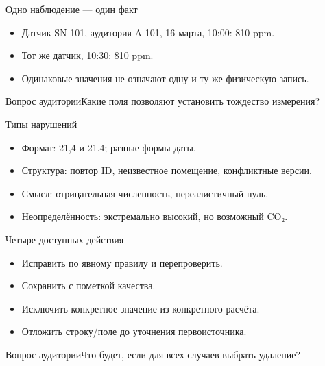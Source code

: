 \documentclass[aspectratio=169,10pt]{beamer}
\begin{document}
\begin{frame}[t]{Одно наблюдение — один факт}
\begin{itemize}
\item Датчик SN-101, аудитория A-101, 16 марта, 10:00: 810 ppm.
\vspace{4pt}
\item Тот же датчик, 10:30: 810 ppm.
\vspace{4pt}
\item Одинаковые значения не означают одну и ту же физическую запись.
\vspace{4pt}
\end{itemize}
\vfill\begin{alertblock}{Вопрос аудитории}Какие поля позволяют установить тождество измерения?\end{alertblock}
\end{frame}
\begin{frame}[t]{Типы нарушений}
\begin{itemize}
\item Формат: 21,4 и 21.4; разные формы даты.
\vspace{4pt}
\item Структура: повтор ID, неизвестное помещение, конфликтные версии.
\vspace{4pt}
\item Смысл: отрицательная численность, нереалистичный нуль.
\vspace{4pt}
\item Неопределённость: экстремально высокий, но возможный CO₂.
\vspace{4pt}
\end{itemize}
\end{frame}
\begin{frame}[t]{Четыре доступных действия}
\begin{itemize}
\item Исправить по явному правилу и перепроверить.
\vspace{4pt}
\item Сохранить с пометкой качества.
\vspace{4pt}
\item Исключить конкретное значение из конкретного расчёта.
\vspace{4pt}
\item Отложить строку/поле до уточнения первоисточника.
\vspace{4pt}
\end{itemize}
\vfill\begin{alertblock}{Вопрос аудитории}Что будет, если для всех случаев выбрать удаление?\end{alertblock}
\end{frame}
\end{document}

